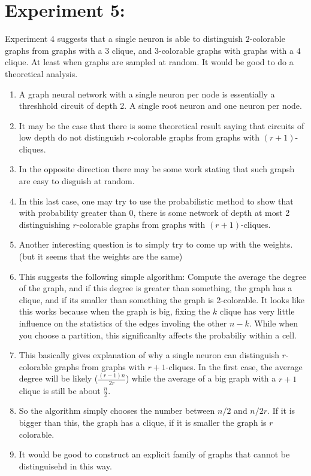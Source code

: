 \section{Experiment 5:}

Experiment 4 suggests that a single neuron is able to distinguish $2$-colorable graphs from graphs with a $3$ clique, and $3$-colorable graphs with graphs with a $4$ clique. At least when graphs are sampled at random. It would be good to do a theoretical analysis. 

\begin{enumerate}
\item A graph neural network with a single neuron per node is essentially a 
threshhold circuit of depth 2. A single root neuron and one neuron per node. 
\item It may be the case that there is some theoretical result saying that circuits of low depth do not distinguish $r$-colorable graphs from graphs with $(r+1)$-cliques. 
\item In the opposite direction there may be some work stating that such grapsh are easy to disguish at random. 
\item In this last case, one may try to use the probabilistic method to show that with probability greater than 0, there is some network of depth at most 2 distinguishing $r$-colorable graphs from graphs with $(r+1)$-cliques. 
\item Another interesting question is to simply try to come up with the weights. (but it seems that the weights are the same)
\item This suggests the following simple algorithm: Compute the average the degree of the graph, and if this degree is greater than something, the graph has a clique, and if its smaller than something the graph is 2-colorable. It looks like this works because when the graph is big, fixing the $k$ clique has very little influence on the statistics of the edges involing the other $n-k$. While when you choose a partition, this significanlty affects the probabiliy within a cell. 
\item This basically gives explanation of why a single neuron can distinguish $r$-colorable graphs from graphs with $r+1$-cliques. In the first case, the average degree will be likely ($\frac{(r-1)n}{2r}$) while the average of a big graph with a $r+1$ clique is still be about $\frac{n}{2}$. 
\item So the algorithm simply chooses the number between $n/2$ and $n/2r$. If it is bigger than this, the graph has a clique, if it is smaller the graph is $r$ colorable. 
\item It would be good to construct an explicit family of graphs that cannot be distinguisehd in this way. 
\end{enumerate}
